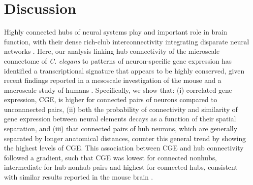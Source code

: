 \documentclass[10pt,letterpaper]{article}
\begin{document}
{%

%
%
%
%
%

\section*{Discussion}
Highly connected hubs of neural systems play and important role in brain function, with their dense rich-club interconnectivity integrating disparate neural networks \cite{vandenHeuvel:2013ge, Fornito:2015dq, deReus:2013cy, vandenHeuvel:2013ij}.
Here, our analysis linking hub connectivity of the microscale connectome of \emph{C. elegans} to patterns of neuron-specific gene expression has identified a transcriptional signature that appears to be highly conserved, given recent findings reported in a mesoscale investigation of the mouse \cite{Fulcher:2016ck} and a macroscale study of humans \cite{Vertes:2016in}.
Specifically, we show that:
(i) correlated gene expression, CGE, is higher for connected pairs of neurons compared to unconnnected pairs,
(ii) both the probability of connectivity and similarity of gene expression between neural elements decays as a function of their spatial separation, and
(iii) that connected pairs of hub neurons, which are generally separated by longer anatomical distances, counter this general trend by showing the highest levels of CGE.
This association between CGE and hub connectivity followed a gradient, such that CGE was lowest for connected nonhubs, intermediate for hub-nonhub pairs and highest for connected hubs, consistent with similar results reported in the mouse brain \cite{Fulcher:2016ck}.

}
\end{document}
